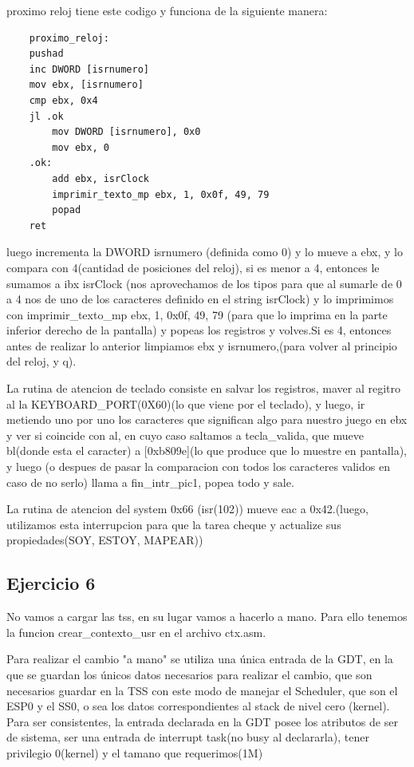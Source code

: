 \documentclass[a4paper]{article}
\newenvironment{codesnippet}{%
	\begin{Sbox}\begin{minipage}{\textwidth}\sffamily\small}%
	{\end{minipage}\end{Sbox}%
		\begin{center}%
		\vspace{-0.4cm}\colorbox{litegrey}{\TheSbox}\end{center}\vspace{0.3cm}}
\begin{document}
	
	proximo reloj tiene este  codigo y funciona de la siguiente manera:
\begin{codesnippet}
\begin{verbatim}		
	proximo_reloj:
    pushad
    inc DWORD [isrnumero]
    mov ebx, [isrnumero]
    cmp ebx, 0x4
    jl .ok
        mov DWORD [isrnumero], 0x0
        mov ebx, 0
    .ok:
        add ebx, isrClock
        imprimir_texto_mp ebx, 1, 0x0f, 49, 79
        popad
    ret 
\end{verbatim}
\end{codesnippet}

	 luego incrementa la DWORD isrnumero (definida como 0) y lo mueve a ebx, y lo compara con 4(cantidad de posiciones del reloj), si es menor a 4, entonces le sumamos a ibx isrClock (nos aprovechamos de los tipos para que al sumarle de 0 a 4 nos de uno de los caracteres definido en el string isrClock) y lo imprimimos con imprimir_texto_mp ebx, 1, 0x0f, 49, 79 (para que lo imprima en la parte inferior derecho de la pantalla) y popeas los registros y volves.Si es 4, entonces antes de realizar lo anterior limpiamos ebx y isrnumero,(para volver al principio del reloj, y q).	
	
	
	La rutina de atencion de teclado consiste en salvar los registros, maver al regitro al la KEYBOARD_PORT(0X60)(lo que viene por el teclado), y luego, ir metiendo uno por uno los caracteres que significan algo para nuestro juego en ebx y ver si coincide con al, en cuyo caso saltamos a tecla_valida, que mueve bl(donde esta el caracter) a [0xb809e](lo que produce que lo muestre en pantalla), y luego (o despues de pasar la comparacion con todos los caracteres validos en caso de no serlo) llama a fin_intr_pic1, popea todo y sale. 
	
	La rutina de atencion del system 0x66 (isr(102)) mueve eac a 0x42.(luego, utilizamos esta interrupcion para que la tarea cheque y actualize sus propiedades(SOY, ESTOY, MAPEAR))
	
\subsection{Ejercicio 6}

No vamos a cargar las tss, en su lugar vamos a hacerlo a mano. Para ello tenemos la funcion crear_contexto_usr en el archivo ctx.asm.

Para realizar el cambio "a mano" se utiliza una única entrada de la GDT, en la que se guardan los únicos datos necesarios para realizar el cambio, que son necesarios guardar en la TSS con este modo de manejar el Scheduler, que son el ESP0 y el SS0, o sea los datos correspondientes al stack de nivel cero (kernel).
Para ser consistentes, la entrada declarada en la GDT posee los atributos de ser de sistema, ser una entrada de interrupt task(no busy al declararla), tener privilegio 0(kernel) y el tamano que requerimos(1M)
\end{document}

